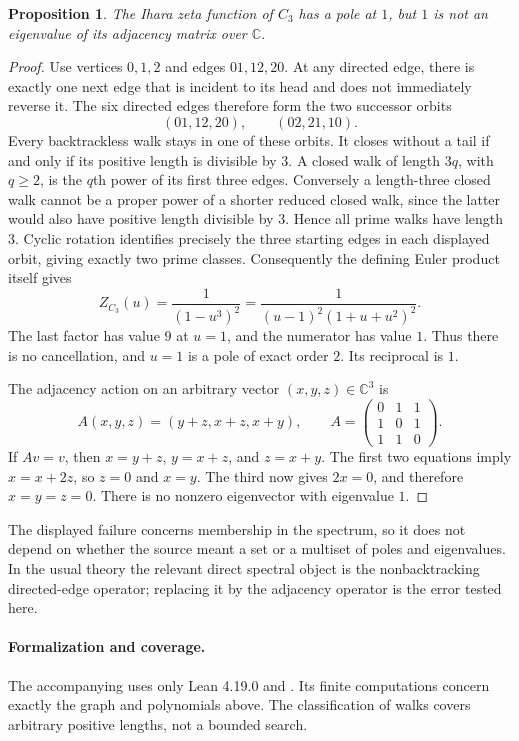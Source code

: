 \documentclass[10pt]{article}
\newtheorem{proposition}{Proposition}
\newcommand{\code}[1]{\texttt{\small\detokenize{#1}}}
\begin{document}
\begin{proposition}
The Ihara zeta function of $C_3$ has a pole at $1$, but $1$ is not an
eigenvalue of its adjacency matrix over $\mathbb C$.
\end{proposition}
\begin{proof}
Use vertices $0,1,2$ and edges $01,12,20$. At any directed edge, there
is exactly one next edge that is incident to its head and does not
immediately reverse it. The six directed edges therefore form the two
successor orbits
\[
 (01,12,20),\qquad (02,21,10).
\]
Every backtrackless walk stays in one of these orbits. It closes
without a tail if and only if its positive length is divisible by $3$.
A closed walk of length $3q$, with $q\ge2$, is the $q$th power of its
first three edges. Conversely a length-three closed walk cannot be a
proper power of a shorter reduced closed walk, since the latter would
also have positive length divisible by $3$. Hence all prime walks have
length $3$. Cyclic rotation identifies precisely the three starting
edges in each displayed orbit, giving exactly two prime classes.
Consequently the defining Euler product itself gives
\[
 Z_{C_3}(u)=\frac{1}{(1-u^3)^2}
          =\frac{1}{(u-1)^2(1+u+u^2)^2}.
\]
The last factor has value $9$ at $u=1$, and the numerator has value
$1$. Thus there is no cancellation, and $u=1$ is a pole of exact order
$2$. Its reciprocal is $1$.

The adjacency action on an arbitrary vector $(x,y,z)\in\mathbb C^3$ is
\[
 A(x,y,z)=(y+z,x+z,x+y),\qquad
 A=\begin{pmatrix}0&1&1\\1&0&1\\1&1&0\end{pmatrix}.
\]
If $Av=v$, then $x=y+z$, $y=x+z$, and $z=x+y$.
The first two equations imply $x=x+2z$, so $z=0$ and $x=y$.
The third now gives $2x=0$, and therefore $x=y=z=0$.
There is no nonzero eigenvector with eigenvalue $1$.
\end{proof}

The displayed failure concerns membership in the spectrum, so it does
not depend on whether the source meant a set or a multiset of poles
and eigenvalues. In the usual theory the relevant direct spectral
object is the nonbacktracking directed-edge operator; replacing it
by the adjacency operator is the error tested here.

\paragraph{Formalization and coverage.}
The accompanying \code{lean/Main.lean} uses only Lean 4.19.0 and
\code{Std}. Its finite computations concern exactly the graph and
polynomials above. The classification of walks covers arbitrary
positive lengths, not a bounded search.
\end{document}
